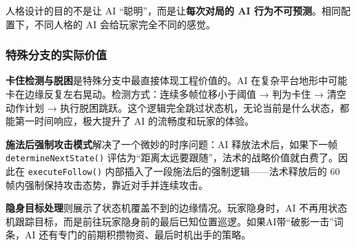 \documentclass[utf8]{ctexart}
\begin{document}
人格设计的目的不是让 AI “聪明”，而是让\textbf{每次对局的 AI 行为不可预测}。相同配置下，不同人格的 AI 会给玩家完全不同的感觉。

\subsubsection{特殊分支的实际价值}

\textbf{卡住检测与脱困}是特殊分支中最直接体现工程价值的。AI 在复杂平台地形中可能卡在边缘反复左右晃动。检测方式：连续多帧位移小于阈值 → 判为卡住 → 清空动作计划 → 执行脱困跳跃。这个逻辑完全跳过状态机，无论当前是什么状态，都能第一时间响应，极大提升了 AI 的流畅度和玩家的体验。

\textbf{施法后强制攻击模式}解决了一个微妙的时序问题：AI 释放法术后，如果下一帧 \texttt{determineNextState()} 评估为“距离太远要跟随”，法术的战略价值就白费了。因此在 \texttt{executeFollow()} 内部插入了一段施法后的强制逻辑——法术释放后的 60 帧内强制保持攻击态势，靠近对手并连续攻击。

\textbf{隐身目标处理}则展示了状态机覆盖不到的边缘情况。玩家隐身时，AI 不再用状态机跟踪目标，而是前往玩家隐身前的最后已知位置巡逻。如果AI带“破影一击”词条，AI 还有专门的前期积攒物资、最后时机出手的策略。
\end{document}
